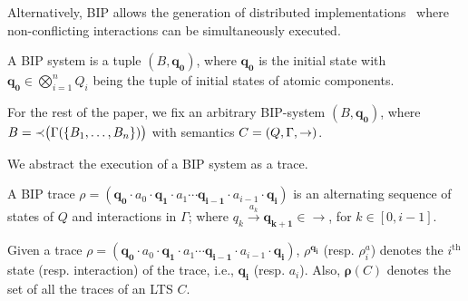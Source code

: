 Alternatively, BIP allows the generation of distributed
implementations~\cite{bip-distributed} where non-conflicting interactions
can be simultaneously executed.

\begin{definition}
\label{def:bipsystem}
A BIP system is a tuple $(B,  \bm{q_0})$, where $ \bm{q_0}$ is the initial state with $ \bm{q_0} \in \bigotimes_{i=1}^n Q_i$ being the tuple of initial states of atomic components.
\end{definition}


For the rest of the paper, we fix an arbitrary BIP-system $(B,  \bm{q_0})$, where  $B = \mathit{\prec}\big(\Gamma(\{B_1, \ldots, B_n\})\big)$ with semantics $C = (Q, \Gamma, \stackrel{}{\rightarrow})$.

We abstract the execution of a BIP system as a trace.
%
\begin{definition}
\label{def:trace-global}
A BIP trace $\rho = ( \bm{q_0} \cdot a_0 \cdot  \bm{q_1} \cdot a_1 \cdots  \bm{q_{i-1}} \cdot a_{i-1} \cdot  \bm{q_i})$ is an alternating sequence of states of $Q$ and interactions in $\Gamma$; where $q_k \xrightarrow{a_k}  \bm{q_{k+1}} \in \rightarrow$, for $k \in [0, i-1]$.
\end{definition}

Given a trace $\rho = ( \bm{q_0} \cdot a_0 \cdot  \bm{q_1} \cdot a_1 \cdots  \bm{q_{i-1}} \cdot a_{i-1} \cdot  \bm{q_i})$, 
$\rho^{ \bm{q_i}}$ (resp. $\rho^a_i$) denotes the $i^\text{th}$ state (resp. interaction) of the trace, i.e., $ \bm{q_i}$ (resp. $a_i$). Also, $\bm{\rho}(C)$ denotes the set of all the traces of an LTS $C$. 
